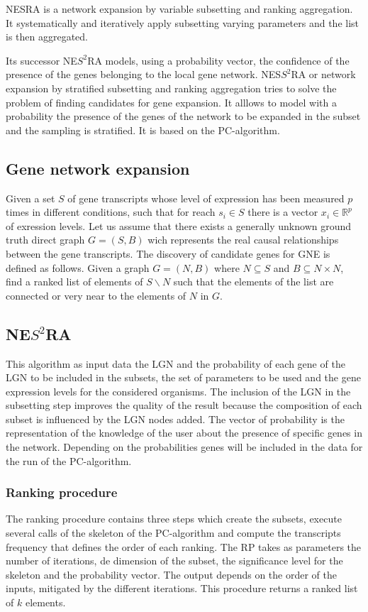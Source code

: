 NESRA is a network expansion by variable subsetting and ranking aggregation.
It systematically and iteratively apply subsetting varying parameters and the list is then aggregated.



Its successor NE$S^2$RA models, using a probability vector, the confidence of the presence of the genes belonging to the local gene network.
NES$S^2$RA or network expansion by stratified subsetting and ranking aggregation tries to solve the problem of finding candidates for gene expansion.
It alllows to model with a probability the presence of the genes of the network to be expanded in the subset and the sampling is stratified.
It is based on the PC-algorithm.

	\subsection{Gene network expansion}
	Given a set $S$ of gene transcripts whose level of expression has been measured $p$ times in different conditions, such that for reach $s_i\in S$ there is a vector $x_i\in\mathbb{R}^p$ of exression levels.
	Let us assume that there exists a generally unknown ground truth direct graph $G=(S,B)$ wich represents the real causal relationships between the gene transcripts.
	The discovery of candidate genes for GNE is defined as follows.
	Given a graph $G=(N,B)$ where $N\subseteq S$ and $B\subseteq N\times N$, find a ranked list of elements of $S\backslash N$ such that the elements of the list are connected or very near to the elements of $N$ in $G$.

	\subsection{NE$S^2$RA}
	This algorithm as input data the LGN and the probability of each gene of the LGN to be included in the subsets, the set of parameters to be used and the gene expression levels for the considered organisms.
	The inclusion of the LGN in the subsetting step improves the quality of the result because the composition of each subset is influenced by the LGN nodes added.
	The vector of probability is the representation of the knowledge of the user about the presence of specific genes in the network.
	Depending on the probabilities genes will be included in the data for the run of the PC-algorithm.

		\subsubsection{Ranking procedure}
		The ranking procedure contains three steps which create the subsets, execute several calls of the skeleton of the PC-algorithm and compute the transcripts frequency that defines the order of each ranking.
		The RP takes as parameters the number of iterations, de dimension of the subset, the significance level for the skeleton and the probability vector.
		The output depends on the order of the inputs, mitigated by the different iterations.
		This procedure returns a ranked list of $k$ elements.

